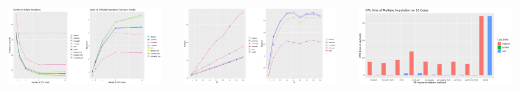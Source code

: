 \documentclass[20pt,margin=1in,innermargin=-4.5in,blockverticalspace=-0.25in]{tikzposter}
\begin{document}
\begin{columns}
{        \vspace{1em}
        \begin{tikzfigure}
            \includegraphics[width=1\linewidth]{img/runtime_ncores_speedup}
        \end{tikzfigure}
        \vspace{1em}
       
       \vspace{1em}
       \begin{tikzfigure}
       	\includegraphics[width=1\linewidth]{img/runtime_nimp_speedup_resized}
       \end{tikzfigure}
       \vspace{1em}
       
      \vspace{1em}
      \begin{tikzfigure}
      	\includegraphics[width=0.7\linewidth]{img/2022-01-15_benchmark_core_Linux_cpu_time}
      \end{tikzfigure}
      \vspace{1em} 
    }


\end{columns}
\end{document}
